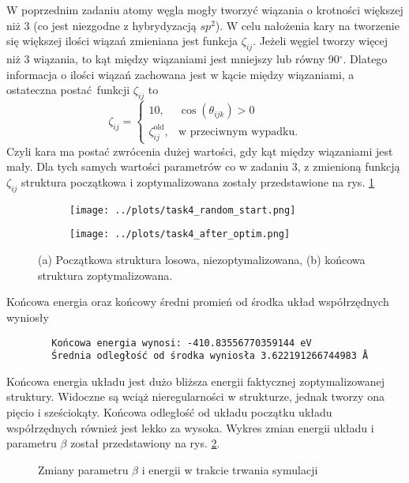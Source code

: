 \documentclass[a4paper,12pt]{article}
\begin{document}
	W poprzednim zadaniu atomy węgla mogły tworzyć wiązania o krotności większej niż 3 (co jest niezgodne z hybrydyzacją $sp^2$). 
	W celu nałożenia kary na tworzenie się większej ilości wiązań zmieniana jest funkcja $\zeta_{ij}$.
	Jeżeli węgiel tworzy więcej niż 3 wiązania, to kąt między wiązaniami jest mniejszy lub równy 90$^\circ$.
	Dlatego informacja o ilości wiązań zachowana jest w kącie między wiązaniami, a ostateczna postać funkcji $\zeta_{ij}$ to 
	\begin{equation}
		\zeta_{ij} = 
		\begin{cases}
			10, & \cos(\theta_{ijk}) > 0 \\
			\zeta_{ij}^\text{old}, & \text{w przeciwnym wypadku.}
		\end{cases}
	\end{equation}
	Czyli kara ma postać zwrócenia dużej wartości, gdy kąt między wiązaniami jest mały.
	Dla tych samych wartości parametrów co w zadaniu 3, z zmienioną funkcją $\zeta_{ij}$ struktura początkowa i zoptymalizowana zostały przedstawione na rys. \ref{task4_optim}
	\begin{figure}[H]
		\centering
		\begin{subfigure}{0.49\textwidth}
			\centering 
			\texttt{[image: ../plots/task4\_random\_start.png]}
			\caption{}
		\end{subfigure}
		\begin{subfigure}{0.49\textwidth}
			\centering 
			\texttt{[image: ../plots/task4\_after\_optim.png]}
			\caption{}
		\end{subfigure}
		\caption{(a) Początkowa struktura losowa, niezoptymalizowana, (b) końcowa struktura zoptymalizowana.}
		\label{task4_optim}
	\end{figure}
	
	\noindent Końcowa energia oraz końcowy średni promień od środka układ współrzędnych wyniosły
	\begin{verbatim}
		Końcowa energia wynosi: -410.83556770359144 eV
		Średnia odległość od środka wyniosła 3.622191266744983 Å
	\end{verbatim}
	Końcowa energia układu jest dużo bliższa energii faktycznej zoptymalizowanej struktury. 
	Widoczne są wciąż nieregularności w strukturze, jednak tworzy ona pięcio i sześciokąty.
	Końcowa odległość od układu początku układu współrzędnych również jest lekko za wysoka. 
	Wykres zmian energii układu i parametru $\beta$ został przedstawiony na rys. \ref{task4_beta}.
	\begin{figure}[H]
		\centering
		
		\caption{Zmiany parametru $\beta$ i energii w trakcie trwania symulacji}
		\label{task4_beta}
	\end{figure}
	
\end{document}
